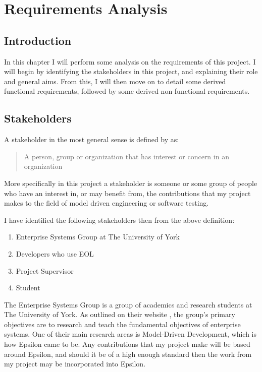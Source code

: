 \chapter{Requirements Analysis}
\label{chap:requirements}

\section{Introduction}

In this chapter I will perform some analysis on the requirements of this project. I will begin by identifying the stakeholders in this project, and explaining their role and general aims. From this, I will then move on to detail some derived functional requirements, followed by some derived non-functional requirements.

\section{Stakeholders}
A stakeholder in the most general sense is defined by \citet{stakeholderDef} as:

\begin{quote}
	A person, group or organization that has interest or concern in an organization
\end{quote}

More specifically in this project a stakeholder is someone or some group of people who have an interest in, or may benefit from, the contributions that my project makes to the field of model driven engineering or software testing.

I have identified the following stakeholders then from the above definition:

\begin{enumerate}
\item Enterprise Systems Group at The University of York
\item Developers who use EOL
\item Project Supervisor
\item Student
\end{enumerate}

The Enterprise Systems Group is a group of academics and research students at The University of York. As outlined on their website \cite{ESG}, the group's primary objectives are to research and teach the fundamental objectives of enterprise systems. One of their main research areas is Model-Driven Development, which is how Epsilon came to be. Any contributions that my project make will be based around Epsilon, and should it be of a high enough standard then the work from my project may be incorporated into Epsilon.

